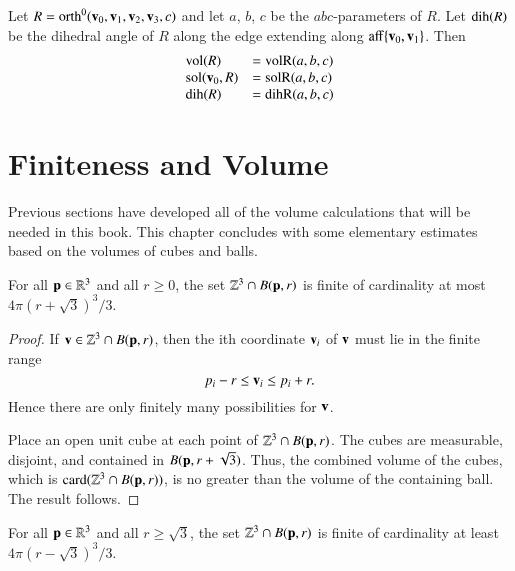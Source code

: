 \begin{lemma}\label{lemma:orth:abc} 
Let $R={\operatorname{orth}}^0({\mathbf v}_0,{\mathbf v}_1,{\mathbf v}_2,{\mathbf v}_3,c)$ and let $a$, $b$,
$c$ be the $abc$-parameters of $R$.  Let ${\operatorname{dih}}(R)$ be the dihedral
angle of $R$ along the edge extending along ${\operatorname{aff}}\{{\mathbf v}_0,{\mathbf v}_1\}$.  Then
$$
\begin{array}{lll}
{\operatorname{vol}}(R) &= {\operatorname{volR}}(a,b,c)\\
{\operatorname{sol}}({\mathbf v}_0,R) &= {\operatorname{solR}}(a,b,c)\\
{\operatorname{dih}}(R) &= {\operatorname{dihR}}(a,b,c)\\
\end{array}
$$
\end{lemma}
%
%
%
%

\section{Finiteness and Volume}

Previous sections have developed all of the volume calculations that will
be needed in this book.  This chapter concludes with some 
elementary estimates based on the volumes of  cubes and balls.

\begin{lemma}
    For all ${\mathbf p}\in\mathbb{R}^3$ and all $r\ge 0$, the set
    $\mathbb{Z}^3\cap B({\mathbf p},r)$ is finite of cardinality at most
    $4\pi (r+\sqrt3)^3/3$.
%
\end{lemma}

\begin{proof}  If ${\mathbf v}\in\mathbb{Z}^3\cap B({\mathbf p},r)$, then the ith
coordinate ${\mathbf v}_i$ of ${\mathbf v}$ must lie in the finite range
    $$
    p_i - r \le {\mathbf v}_i \le p_i + r.
    $$
Hence there are only finitely many possibilities for ${\mathbf v}$.


Place an open unit cube at each point of $\mathbb{Z}^3\cap B({\mathbf p},r)$.
The cubes are measurable, disjoint, and contained in
$B({\mathbf p},r+\sqrt3)$.  Thus, the combined volume of the cubes, which is
${\operatorname{card}}(\mathbb{Z}^3\cap B({\mathbf p},r))$,  is no greater than the volume of the
containing ball.  The result follows.
\end{proof}

\begin{lemma}
  For all ${\mathbf p}\in\mathbb{R}^3$ and all $r\ge\sqrt3$, the set
    $\mathbb{Z}^3\cap B({\mathbf p},r)$ is finite of cardinality at least
    $4\pi (r-\sqrt3)^3/3$.
\end{lemma}

